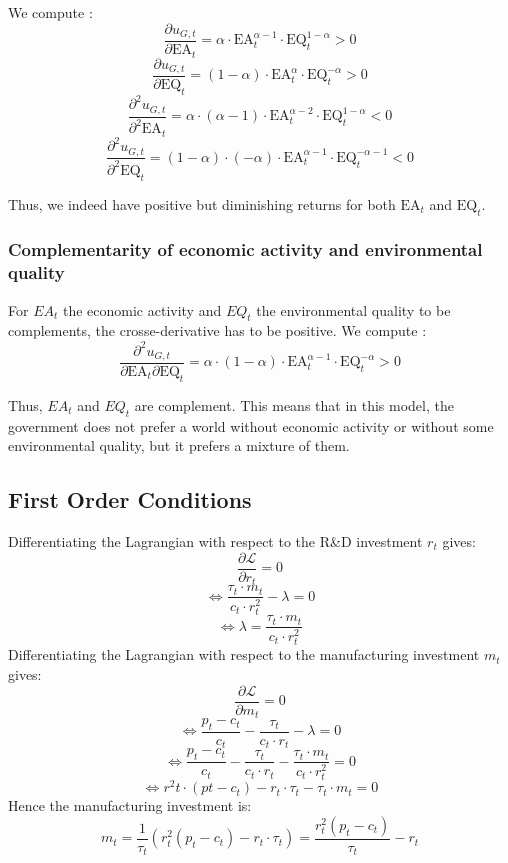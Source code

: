 \documentclass{article}
\begin{document}
We compute : 
$$\frac{\partial u_{G,t}}{\partial \text{EA}_{t}}=\alpha\cdot\text{EA}_{t}^{\alpha-1}\cdot\text{EQ}_{t}^{1-\alpha}>0$$
$$\frac{\partial u_{G,t}}{\partial \text{EQ}_{t}}=(1-\alpha)\cdot\text{EA}_{t}^{\alpha}\cdot\text{EQ}_{t}^{-\alpha}>0$$
$$\frac{\partial^2 u_{G,t}}{\partial^2 \text{EA}_{t}}=\alpha\cdot(\alpha-1)\cdot\text{EA}_{t}^{\alpha-2}\cdot\text{EQ}_{t}^{1-\alpha}<0$$
$$\frac{\partial^2 u_{G,t}}{\partial^2 \text{EQ}_{t}}=(1-\alpha)\cdot(-\alpha)\cdot\text{EA}_{t}^{\alpha-1}\cdot\text{EQ}_{t}^{-\alpha-1}<0$$

Thus, we indeed have positive but diminishing returns for both $\text{EA}_{t}$ and $\text{EQ}_{t}$.

\subsubsection{Complementarity of economic activity and environmental quality}
\label{sec:properties_utility_function_gov_2}

For $EA_{t}$ the economic activity and $EQ_{t}$ the environmental quality to be complements, the crosse-derivative has to be positive. 
We compute :  
$$\frac{\partial^2 u_{G,t}}{\partial \text{EA}_{t} \partial \text{EQ}_{t}}=\alpha\cdot(1-\alpha)\cdot\text{EA}_{t}^{\alpha-1}\cdot\text{EQ}_{t}^{-\alpha}>0$$

Thus, $EA_{t}$ and $EQ_{t}$ are complement. This means that in this model, the government does not prefer a world without economic activity or without some environmental quality, but it prefers a mixture of them. 

\subsection{First Order Conditions}
\label{sec:proof3}
Differentiating the Lagrangian with respect to the R\&D investment $r_{t}$ gives:
$$\frac{\partial \mathcal{L}}{\partial r_{t}}=0$$
$$\Leftrightarrow\frac{\tau_{t}\cdot m_{t}}{c_{t}\cdot r^{2}_{t}}-\lambda=0$$
$$\Leftrightarrow\lambda=\frac{\tau_{t}\cdot m_{t}}{c_{t}\cdot r^{2}_{t}}$$
Differentiating the Lagrangian with respect to the manufacturing investment $m_{t}$ gives:
$$\frac{\partial \mathcal{L}}{\partial m_{t}}=0$$
$$\Leftrightarrow\frac{p_{t}-c_{t}}{c_{t}}-\frac{\tau_{t}}{c_{t}\cdot r_{t}}-\lambda=0$$
$$\Leftrightarrow\frac{p_{t}-c_{t}}{c_{t}}-\frac{\tau_{t}}{c_{t}\cdot r_{t}}-\frac{\tau_{t}\cdot m_{t}}{c_{t}\cdot r^{2}_{t}}=0$$
$$\Leftrightarrow{r^{2}{t}}\cdot(p{t}-c_{t})-r_{t}\cdot \tau_{t}-\tau_{t}\cdot m_{t}=0$$
Hence the manufacturing investment is:
\begin{equation}\tag{5}
    m_{t}=\frac{1}{\tau_{t}}\left(r_{t}^{2}(p_{t}-c_{t})-r_{t}\cdot \tau_{t}\right)=\frac{r_{t}^{2}\left(p_{t}-c_{t}\right)}{\tau_{t}}-r_{t}
\end{equation}
\end{document}
